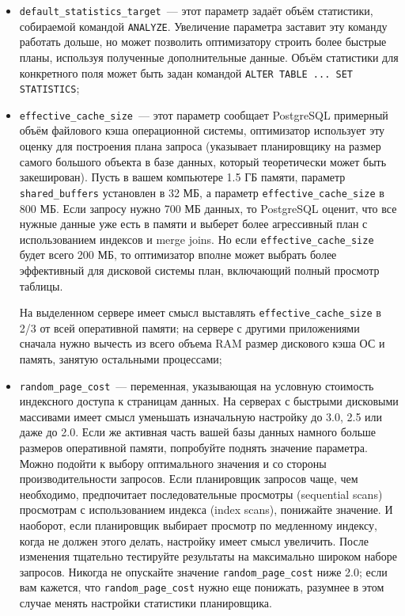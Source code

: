 \begin{itemize}
  \item \lstinline!default_statistics_target!~--- этот параметр задаёт объём статистики, собираемой командой \lstinline!ANALYZE!. Увеличение параметра заставит эту команду работать дольше, но может позволить оптимизатору строить более быстрые планы, используя полученные дополнительные данные. Объём статистики для конкретного поля может быть задан командой \lstinline!ALTER TABLE ... SET STATISTICS!;

  \item \lstinline!effective_cache_size!~--- этот параметр сообщает PostgreSQL примерный объём файлового кэша операционной системы, оптимизатор использует эту оценку для построения плана запроса (указывает планировщику на размер самого большого объекта в базе данных, который теоретически может быть закеширован). Пусть в вашем компьютере 1.5 ГБ памяти, параметр \lstinline!shared_buffers! установлен в 32 МБ, а параметр \lstinline!effective_cache_size! в 800 МБ. Если запросу нужно 700 МБ данных, то PostgreSQL оценит, что все нужные данные уже есть в памяти и выберет более агрессивный план с использованием индексов и merge joins. Но если \lstinline!effective_cache_size! будет всего 200 МБ, то оптимизатор вполне может выбрать более эффективный для дисковой системы план, включающий полный просмотр таблицы.

На выделенном сервере имеет смысл выставлять \lstinline!effective_cache_size! в 2/3 от всей оперативной памяти; на сервере с другими приложениями сначала нужно вычесть из всего объема RAM размер дискового кэша ОС и память, занятую остальными процессами;

  \item \lstinline!random_page_cost!~--- переменная, указывающая на условную стоимость индексного доступа к страницам данных. На серверах с быстрыми дисковыми массивами имеет смысл уменьшать изначальную настройку до 3.0, 2.5 или даже до 2.0. Если же активная часть вашей базы данных намного больше размеров оперативной памяти, попробуйте поднять значение параметра. Можно подойти к выбору оптимального значения и со стороны производительности запросов. Если планировщик запросов чаще, чем необходимо, предпочитает последовательные просмотры (sequential scans) просмотрам с использованием индекса (index scans), понижайте значение. И наоборот, если планировщик выбирает просмотр по медленному индексу, когда не должен этого делать, настройку имеет смысл увеличить. После изменения тщательно тестируйте результаты на максимально широком наборе запросов. Никогда не опускайте значение \lstinline!random_page_cost! ниже 2.0; если вам кажется, что \lstinline!random_page_cost! нужно еще понижать, разумнее в этом случае менять настройки статистики планировщика.
\end{itemize}


